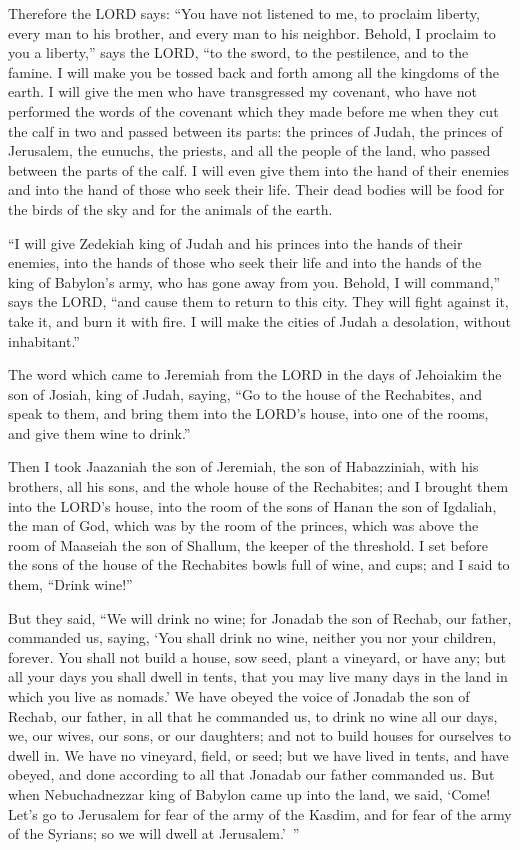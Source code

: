 \myverse{}Therefore the LORD says: “You have not listened to me, to proclaim liberty, every man to his brother, and every man to his neighbor. Behold, I proclaim to you a liberty,” says the LORD, “to the sword, to the pestilence, and to the famine. I will make you be tossed back and forth among all the kingdoms of the earth. \myverse{}I will give the men who have transgressed my covenant, who have not performed the words of the covenant which they made before me when they cut the calf in two and passed between its parts: \myverse{}the princes of Judah, the princes of Jerusalem, the eunuchs, the priests, and all the people of the land, who passed between the parts of the calf. \myverse{}I will even give them into the hand of their enemies and into the hand of those who seek their life. Their dead bodies will be food for the birds of the sky and for the animals of the earth.


\myverse{}“I will give Zedekiah king of Judah and his princes into the hands of their enemies, into the hands of those who seek their life and into the hands of the king of Babylon’s army, who has gone away from you. \myverse{}Behold, I will command,” says the LORD, “and cause them to return to this city. They will fight against it, take it, and burn it with fire. I will make the cities of Judah a desolation, without inhabitant.”


\mychapter{} \myverse*{}The word which came to Jeremiah from the LORD in the days of Jehoiakim the son of Josiah, king of Judah, saying, \myverse{}“Go to the house of the Rechabites, and speak to them, and bring them into the LORD’s house, into one of the rooms, and give them wine to drink.”

\myverse{}Then I took Jaazaniah the son of Jeremiah, the son of Habazziniah, with his brothers, all his sons, and the whole house of the Rechabites; \myverse{}and I brought them into the LORD’s house, into the room of the sons of Hanan the son of Igdaliah, the man of God, which was by the room of the princes, which was above the room of Maaseiah the son of Shallum, the keeper of the threshold. \myverse{}I set before the sons of the house of the Rechabites bowls full of wine, and cups; and I said to them, “Drink wine!”


\myverse{}But they said, “We will drink no wine; for Jonadab the son of Rechab, our father, commanded us, saying, ‘You shall drink no wine, neither you nor your children, forever. \myverse{}You shall not build a house, sow seed, plant a vineyard, or have any; but all your days you shall dwell in tents, that you may live many days in the land in which you live as nomads.’ \myverse{}We have obeyed the voice of Jonadab the son of Rechab, our father, in all that he commanded us, to drink no wine all our days, we, our wives, our sons, or our daughters; \myverse{}and not to build houses for ourselves to dwell in. We have no vineyard, field, or seed; \myverse{}but we have lived in tents, and have obeyed, and done according to all that Jonadab our father commanded us. \myverse{}But when Nebuchadnezzar king of Babylon came up into the land, we said, ‘Come! Let’s go to Jerusalem for fear of the army of the Kasdim, and for fear of the army of the Syrians; so we will dwell at Jerusalem.’ ”


